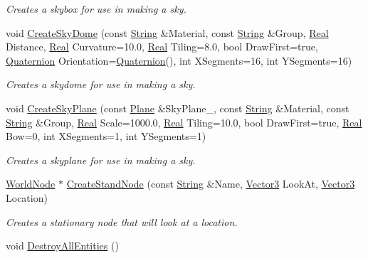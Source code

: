 \begin{DoxyCompactItemize}
\begin{DoxyCompactList}\small\item\em Creates a skybox for use in making a sky. \item\end{DoxyCompactList}\item 
void \hyperlink{classMezzanine_1_1SceneManager_a5862eefa87c9fcda9fdba7fa69efd6cf}{CreateSkyDome} (const \hyperlink{namespaceMezzanine_acf9fcc130e6ebf08e3d8491aebcf1c86}{String} \&Material, const \hyperlink{namespaceMezzanine_acf9fcc130e6ebf08e3d8491aebcf1c86}{String} \&Group, \hyperlink{namespaceMezzanine_a726731b1a7df72bf3583e4a97282c6f6}{Real} Distance, \hyperlink{namespaceMezzanine_a726731b1a7df72bf3583e4a97282c6f6}{Real} Curvature=10.0, \hyperlink{namespaceMezzanine_a726731b1a7df72bf3583e4a97282c6f6}{Real} Tiling=8.0, bool DrawFirst=true, \hyperlink{classMezzanine_1_1Quaternion}{Quaternion} Orientation=\hyperlink{classMezzanine_1_1Quaternion}{Quaternion}(), int XSegments=16, int YSegments=16)
\begin{DoxyCompactList}\small\item\em Creates a skydome for use in making a sky. \item\end{DoxyCompactList}\item 
void \hyperlink{classMezzanine_1_1SceneManager_a6cea438ed9b13cf613b07e2dd6467c4e}{CreateSkyPlane} (const \hyperlink{classMezzanine_1_1Plane}{Plane} \&SkyPlane\_\-, const \hyperlink{namespaceMezzanine_acf9fcc130e6ebf08e3d8491aebcf1c86}{String} \&Material, const \hyperlink{namespaceMezzanine_acf9fcc130e6ebf08e3d8491aebcf1c86}{String} \&Group, \hyperlink{namespaceMezzanine_a726731b1a7df72bf3583e4a97282c6f6}{Real} Scale=1000.0, \hyperlink{namespaceMezzanine_a726731b1a7df72bf3583e4a97282c6f6}{Real} Tiling=10.0, bool DrawFirst=true, \hyperlink{namespaceMezzanine_a726731b1a7df72bf3583e4a97282c6f6}{Real} Bow=0, int XSegments=1, int YSegments=1)
\begin{DoxyCompactList}\small\item\em Creates a skyplane for use in making a sky. \item\end{DoxyCompactList}\item 
\hyperlink{classMezzanine_1_1WorldNode}{WorldNode} $\ast$ \hyperlink{classMezzanine_1_1SceneManager_a9c2288d7b82f59fad7213f9b21c1b4b6}{CreateStandNode} (const \hyperlink{namespaceMezzanine_acf9fcc130e6ebf08e3d8491aebcf1c86}{String} \&Name, \hyperlink{classMezzanine_1_1Vector3}{Vector3} LookAt, \hyperlink{classMezzanine_1_1Vector3}{Vector3} Location)
\begin{DoxyCompactList}\small\item\em Creates a stationary node that will look at a location. \item\end{DoxyCompactList}\item 
\hypertarget{classMezzanine_1_1SceneManager_a7c2637be3ad7af57f2cc194f305e87ff}{
void \hyperlink{classMezzanine_1_1SceneManager_a7c2637be3ad7af57f2cc194f305e87ff}{DestroyAllEntities} ()}
\label{classMezzanine_1_1SceneManager_a7c2637be3ad7af57f2cc194f305e87ff}


\end{DoxyCompactItemize}
